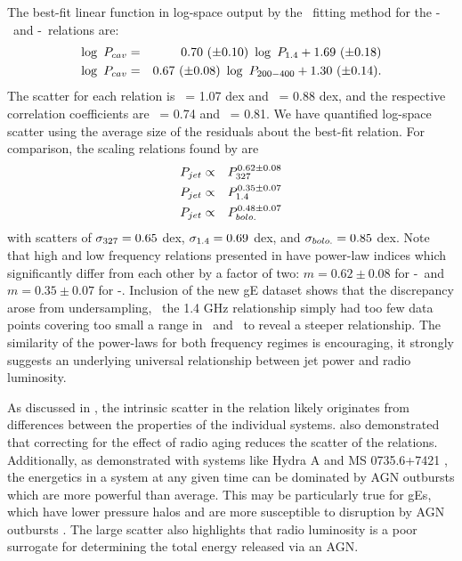 \documentclass{emulateapj}
\begin{document}
The best-fit linear function in log-space output by the \bces\ fitting
method for the \pcav-\phigh\ and \pcav-\plow\ relations are:
\begin{eqnarray}
\log~P_{cav} &=& 0.70~(\pm 0.10)~\log~P_{\mathrm{1.4}} + 1.69~(\pm 0.18)\\
\log~P_{cav} &=& 0.67~(\pm 0.08)~\log~P_{\mathrm{200-400}} + 1.30~(\pm 0.14).
\end{eqnarray}
The scatter for each relation is \shigh\ = 1.07 dex and \slow\ = 0.88
dex, and the respective correlation coefficients are \rhigh\ = 0.74
and \rlow\ = 0.81. We have quantified log-space scatter using the
average size of the residuals about the best-fit relation. For
comparison, the scaling relations found by \citet{birzan08} are
\begin{eqnarray}
P_{jet} &\propto& P_{\mathrm{327}}^{0.62 \pm 0.08}\\
P_{jet} &\propto& P_{\mathrm{1.4}}^{0.35 \pm 0.07}\\
P_{jet} &\propto& P_{bolo.}^{0.48 \pm 0.07}
\end{eqnarray}
with scatters of $\sigma_{\mathrm{327}} = 0.65$ dex, $\sigma_{\mathrm{1.4}} = 0.69$ dex, and
$\sigma_{bolo.} = 0.85$ dex. Note that high and low frequency relations
presented in \citet{birzan08} have power-law indices which
significantly differ from each other by a factor of two: $m = 0.62 \pm
0.08$ for \pcav-\pthree\ and $m = 0.35 \pm 0.07$ for
\pcav-\phigh. Inclusion of the new gE dataset shows that the
discrepancy arose from undersampling, \ie\ the 1.4 GHz relationship
simply had too few data points covering too small a range in
\pcav\ and \prad\ to reveal a steeper relationship. The similarity of
the power-laws for both frequency regimes is encouraging, it strongly
suggests an underlying universal relationship between jet power and
radio luminosity.

As discussed in \citet{birzan04, birzan08}, the intrinsic scatter in
the relation likely originates from differences between the properties
of the individual systems. \citet{birzan08} also demonstrated that
correcting for the effect of radio aging reduces the scatter of the
relations. Additionally, as demonstrated with systems like Hydra A
\citep{hydraa} and MS 0735.6+7421 \citep{ms0735}, the energetics in a
system at any given time can be dominated by AGN outbursts which are
more powerful than average. This may be particularly true for gEs,
which have lower pressure halos and are more susceptible to disruption
by AGN outbursts \citep{minggroups}. The large scatter also highlights
that radio luminosity is a poor surrogate for determining the total
energy released via an AGN.
\end{document}
